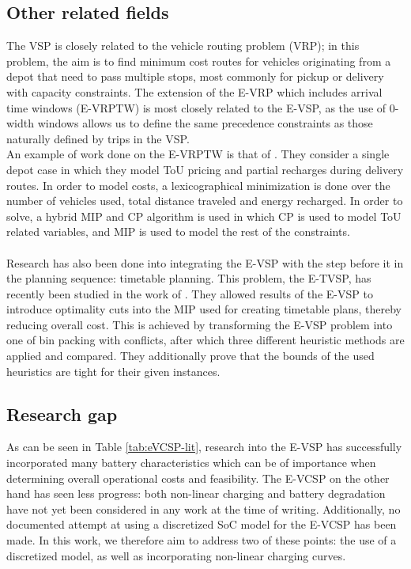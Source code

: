 \documentclass[]{article}
\begin{document}
\subsection{Other related fields}
The VSP is closely related to the vehicle routing problem (VRP); in this problem, the aim is to find minimum cost routes for vehicles originating from a depot that need to pass multiple stops, most commonly for pickup or delivery with capacity constraints. The extension of the E-VRP which includes arrival time windows (E-VRPTW) is most closely related to the E-VSP, as the use of 0-width windows allows us to define the same precedence constraints as those naturally defined by trips in the VSP. \\
An example of work done on the E-VRPTW is that of \citet{Ham2021}. They consider a single depot case in which they model ToU pricing and partial recharges during delivery routes. In order to model costs, a lexicographical minimization is done over the number of vehicles used, total distance traveled and energy recharged. In order to solve, a hybrid MIP and CP algorithm is used in which CP is used to model ToU related variables, and MIP is used to model the rest of the constraints. \\\\
Research has also been done into integrating the E-VSP with the step before it in the planning sequence: timetable planning. This problem, the E-TVSP, has recently been studied in the work of \citet{Stadnichuk2024}. They allowed results of the E-VSP to introduce optimality cuts into the MIP used for creating timetable plans, thereby reducing overall cost. This is achieved by transforming the E-VSP problem into one of bin packing with conflicts, after which three different heuristic methods are applied and compared. They additionally prove that the bounds of the used heuristics are tight for their given instances. 

\subsection{Research gap}
As can be seen in Table \ref{tab:eVCSP-lit}, research into the E-VSP has successfully incorporated many battery characteristics which can be of importance when determining overall operational costs and feasibility. The E-VCSP on the other hand has seen less progress: both non-linear charging and battery degradation have not yet been considered in any work at the time of writing. Additionally, no documented attempt at using a discretized SoC model for the E-VCSP has been made. In this work, we therefore aim to address two of these points: the use of a discretized model, as well as incorporating non-linear charging curves. 
\end{document}
